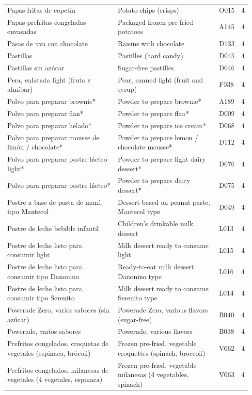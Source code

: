 {\begin{longtable}{p{4.3cm}p{5.5cm}p{1.5cm}p{0.7cm}}
Papas fritas de copetín & Potato chips (crisps) & O015 & 4\\
Papas prefritas congeladas envasadas & Packaged frozen pre-fried potatoes & A145 & 4\\
Pasas de uva con chocolate & Raisins with chocolate & D133 & 4\\
Pastillas & Pastilles (hard candy) & D045 & 4\\
Pastillas sin azúcar & Sugar-free pastilles & D046 & 4\\
Pera, enlatada light (fruta y almíbar) & Pear, canned light (fruit and syrup) & F038 & 4\\
Polvo para preparar brownie* & Powder to prepare brownie* & A189 & 4\\
Polvo para preparar flan* & Powder to prepare flan* & D009 & 4\\
Polvo para preparar helado* & Powder to prepare ice cream* & D068 & 4\\
Polvo para preparar mousse de limón / chocolate* & Powder to prepare lemon / chocolate mousse* & D112 & 4\\
Polvo para preparar postre lácteo light* & Powder to prepare light dairy dessert* & D076 & 4\\
Polvo para preparar postre lácteo* & Powder to prepare dairy dessert* & D075 & 4\\
Postre a base de pasta de maní, tipo Mantecol & Dessert based on peanut paste, Mantecol type & D049 & 4\\
Postre de leche bebible infantil & Children's drinkable milk dessert & L013 & 4\\
Postre de leche listo para consumir light & Milk dessert ready to consume light & L015 & 4\\
Postre de leche listo para consumir tipo Danonino & Ready-to-eat milk dessert Danonino type & L016 & 4\\
Postre de leche listo para consumir tipo Serenito & Milk dessert ready to consume Serenito type & L014 & 4\\
Powerade Zero, varios sabores (sin azúcar) & Powerade Zero, various flavors (sugar-free) & B040 & 4\\
Powerade, varios sabores & Powerade, various flavors & B038 & 4\\
Prefritos congelados, croquetas de vegetales (espinaca, brócoli) & Frozen pre-fried, vegetable croquettes (spinach, broccoli) & V062 & 4\\
Prefritos congelados, milanesas de vegetales (4 vegetales, espinaca) & Frozen pre-fried, vegetable milanesas (4 vegetables, spinach) & V063 & 4\\

\end{longtable}}

